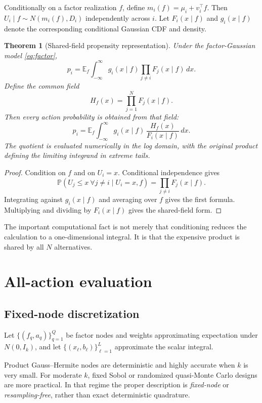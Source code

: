 \documentclass[11pt]{article}
\newtheorem{theorem}{Theorem}
\newcommand{\E}{\mathbb{E}}
\newcommand{\Prob}{\mathbb{P}}
\begin{document}
Conditionally on a factor realization $f$, define $m_i(f) = \mu_i + v_i^\top f$. Then $U_i \mid f \sim N(m_i(f), D_i)$ independently across $i$. Let $F_i(x \mid f)$ and $g_i(x \mid f)$ denote the corresponding conditional Gaussian CDF and density.

\begin{theorem}[Shared-field propensity representation]
\label{thm:sharedfield}
Under the factor-Gaussian model \eqref{eq:factor},
\[
p_i
=
\E_f \int_{-\infty}^{\infty}
g_i(x \mid f)
\prod_{j \ne i} F_j(x \mid f)\, dx.
\]
Define the common field
\[
H_f(x) = \prod_{j=1}^N F_j(x \mid f).
\]
Then every action probability is obtained from that field:
\[
p_i
=
\E_f \int_{-\infty}^{\infty}
g_i(x \mid f)\,
\frac{H_f(x)}{F_i(x \mid f)}\, dx.
\]
The quotient is evaluated numerically in the log domain, with the original product defining the limiting integrand in extreme tails.
\end{theorem}

\begin{proof}
Condition on $f$ and on $U_i = x$. Conditional independence gives
\[
\Prob(U_j \le x\ \forall j \ne i \mid U_i = x, f)
=
\prod_{j \ne i} F_j(x \mid f).
\]
Integrating against $g_i(x \mid f)$ and averaging over $f$ gives the first formula. Multiplying and dividing by $F_i(x \mid f)$ gives the shared-field form.
\end{proof}

The important computational fact is not merely that conditioning reduces the calculation to a one-dimensional integral. It is that the expensive product is shared by all $N$ alternatives.

\section{All-action evaluation}
\label{sec:allaction}

\subsection{Fixed-node discretization}

Let $\{(f_q, a_q)\}_{q=1}^Q$ be factor nodes and weights approximating expectation under $N(0, I_k)$, and let $\{(x_\ell, b_\ell)\}_{\ell=1}^L$ approximate the scalar integral.

Product Gauss--Hermite nodes are deterministic and highly accurate when $k$ is very small. For moderate $k$, fixed Sobol or randomized quasi-Monte Carlo designs are more practical. In that regime the proper description is \emph{fixed-node} or \emph{resampling-free}, rather than exact deterministic quadrature.
\end{document}
